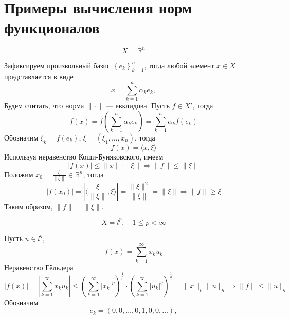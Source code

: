 \documentclass[12pt]{article}
\newtheorem{example}{\hskip\parindent Пример}%
\begin{document}
\section{Примеры вычисления норм функционалов}
\begin{example}
	\begin{equation*}
		X=\mathbb{R}^n
	\end{equation*}
\end{example}
Зафиксируем произвольный базис $\left\{e_k\right\}_{k=1}^{n}$, тогда любой элемент $x\in X$ представляется в виде
\begin{equation*}
	x=\sum\limits_{k=1}^{n}\alpha_k e_k,
\end{equation*}
Будем считать, что норма $\|\cdot\|$ --- евклидова. Пусть $f\in X'$, тогда
\begin{equation*}
	f(x)=f\left(\sum\limits_{k=1}^{n}\alpha_k e_k\right)=\sum\limits_{k=1}^{n}\alpha_k f(e_k)
\end{equation*}
Обозначим $\xi_k=f(e_k)$, $\xi=(\xi_1,\dots, x_n)$, тогда
\begin{equation*}
	f(x)=\langle x,\xi\rangle
\end{equation*}
Используя неравенство Коши-Буняковского, имеем
\begin{equation*}
	|f(x)|\leqslant\|x\|\cdot\|\xi\| \Longrightarrow \|f\|\leqslant\|\xi\|
\end{equation*}
Положим $x_0=\frac{\xi}{\|\xi\|}\in\mathbb{R}^n$, тогда
\begin{equation*}
	|f(x_0)|=\left|\langle\frac{\xi}{\|\xi\|},\xi\rangle\right|=\frac{\|\xi\|^2}{\|\xi\|}=\|\xi\| \Longrightarrow \|f\|\geqslant\xi
\end{equation*}
Таким образом, $\|f\|=\|\xi\|$.
\begin{example}
\begin{equation*}
	X=l^p, \quad 1\leqslant p<\infty
\end{equation*}
\end{example}
Пусть $u\in l^q$, 
\begin{equation*}
f(x)=\sum\limits_{k=1}^{\infty}x_ku_k
\end{equation*}
Неравенство Гёльдера
\begin{equation*}
|f(x)|=\left|\sum\limits_{k=1}^{\infty}x_ku_k\right|\leqslant\left(\sum\limits_{k=1}^{\infty}|x_k|^p\right)^{\frac{1}{p}}\cdot\left(\sum\limits_{k=1}^{\infty}|u_k|^q\right)^{\frac{1}{q}}=\|x\|_p\|u\|_q \Longrightarrow \|f\|\leqslant\|u\|_q
\end{equation*}
Обозначим
\begin{equation*}
e_k=(0,0,\dots,0,1,0,0,\dots),
\end{equation*}
\end{document}
